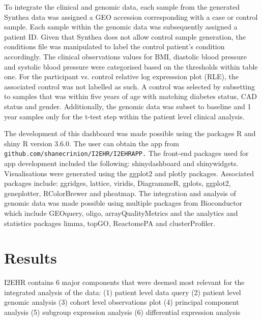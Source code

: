 \documentclass{bioinfo}
\begin{document}
\begin{methods}
To integrate the clinical and genomic data, each sample from the generated Synthea data was assigned a GEO accession corresponding with a case or control sample. Each sample within the genomic data was subsequently assigned a patient ID. Given that Synthea does not allow control sample generation, the conditions file was manipulated to label the control patient's condition accordingly. The clinical observations values for BMI, diastolic blood pressure and systolic blood pressure were categorised based on the thresholds within table one. For the participant vs. control relative log expresssion plot (RLE), the associated control was not labelled as such. A control was selected by subsetting to samples that was within five years of age with matching diabetes status, CAD status and gender. Additionally, the genomic data was subset to baseline and 1 year samples only for the t-test step within the patient level clinical analysis.


The development of this dashboard was made possible using the packages R and shiny 
R version 3.6.0. The user can obtain the app from {\tt \small github.com/shanecrinion/I2EHR/I2EHR\textunderscore APP.}  The front-end packages used for app development included the following: shinydashboard and shinywidgets. Visualisations were generated using the ggplot2 and plotly packages. Associated packages include: ggridges, lattice, viridis, DiagrammeR, gplots, ggplot2, geneplotter, RColorBrewer and pheatmap. The integration and analysis of genomic data was made possible using multiple packages from Bioconductor which include GEOquery, oligo, arrayQualityMetrics and the analytics and statistics packages limma, topGO, ReactomePA and clusterProfiler. 


\end{methods}




\section{Results}
I2EHR contains 6 major components that were deemed most relevant for the integrated analysis of the data: (1) patient level data query 
(2) patient level genomic analysis 
(3) cohort level observations plot 
(4) principal component analysis 
(5) subgroup expression analysis 
(6) differential expression analysis
\end{document}
